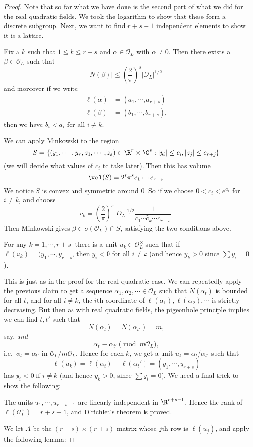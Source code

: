 \documentclass[a4paper]{article}
\begin{document}
\begin{proof}
  Note that so far what we have done is the second part of what we did for the real quadratic fields. We took the logarithm to show that these form a discrete subgroup. Next, we want to find $r + s - 1$ independent elements to show it is a lattice.

  \begin{claim}
    Fix a $k$ such that $1 \leq k \leq r + s$ and $\alpha \in \mathcal{O}_L$ with $\alpha \not= 0$. Then there exists a $\beta \in \mathcal{O}_L$ such that
    \[
      |N(\beta)| \leq \left(\frac{2}{\pi}\right)^s |D_L|^{1/2},
    \]
    and moreover if we write
    \begin{align*}
      \ell(\alpha) &= (a_1, \cdots, a_{r + s})\\
      \ell(\beta) &= (b_1, \cdots, b_{r + s}),
    \end{align*}
    then we have $b_i < a_i$ for all $i \not= k$.
  \end{claim}
  We can apply Minkowski to the region
  \[
    S = \{(y_1, \cdots, y_r, z_1, \cdots, z_s) \in \R^r \times \C^s: |y_i| \leq c_i, |z_j| \leq c_{r + j}\}
  \]
  (we will decide what values of $c_i$ to take later). Then this has volume
  \[
    \vol(S) = 2^r \pi^s c_1 \cdots c_{r + s}.
  \]
  We notice $S$ is convex and symmetric around $0$. So if we choose $0 < c_i < e^{a_i}$ for $i \not= k$, and choose
  \[
    c_k = \left(\frac{2}{\pi}\right)^s |D_L|^{1/2} \frac{1}{c_1 \cdots \hat{c}_k \cdots c_{r + s}}.
  \]
  Then Minkowski gives $\beta \in \sigma(\mathcal{O}_L) \cap S$, satisfying the two conditions above.

  \begin{claim}
    For any $k = 1, \cdots, r + s$, there is a unit $u_k \in \mathcal{O}_L^\times$ such that if $\ell(u_k) = (y_1, \cdots, y_{r + s}$, then $y_i < 0$ for all $i \not= k$ (and hence $y_k > 0$ since $\sum y_i = 0$).
  \end{claim}
  This is just as in the proof for the real quadratic case. We can repeatedly apply the previous claim to get a sequence $\alpha_1, \alpha_2, \cdots \in \mathcal{O}_L$ such that $N(\alpha_t)$ is bounded for all $t$, and for all $i \not= k$, the $i$th coordinate of $\ell(\alpha_1), \ell(\alpha_2), \cdots$ is strictly decreasing. But then as with real quadratic fields, the pigeonhole principle implies we can find $t, t'$ such that
  \[
    N(\alpha_t) = N(\alpha_{t'}) = m,
  \]
  say, \emph{and}
  \[
    \alpha_t \equiv \alpha_{t'} \pmod {m\mathcal{O}_L},
  \]
  i.e.\ $\alpha_t = \alpha_{t'}$ in $\mathcal{O}_L/m\mathcal{O}_L$. Hence for each $k$, we get a unit $u_k = \alpha_t/\alpha_{t'}$ such that
  \[
    \ell(u_k) = \ell(\alpha_t) - \ell(\alpha_t') = (y_1, \cdots, y_{r + s})
  \]
  has $y_i < 0$ if $i \not= k$ (and hence $y_k > 0$, since $\sum y_i = 0$). We need a final trick to show the following:
  \begin{claim}
    The units $u_1, \cdots, u_{r + s - 1}$ are linearly independent in $\R^{r + s - 1}$. Hence the rank of $\ell(\mathcal{O}_L^\times) = r + s - 1$, and Dirichlet's theorem is proved.
  \end{claim}
  We let $A$ be the $(r + s)\times (r + s)$ matrix whose $j$th row is $\ell(u_j)$, and apply the following lemma:


\end{proof}
\end{document}
